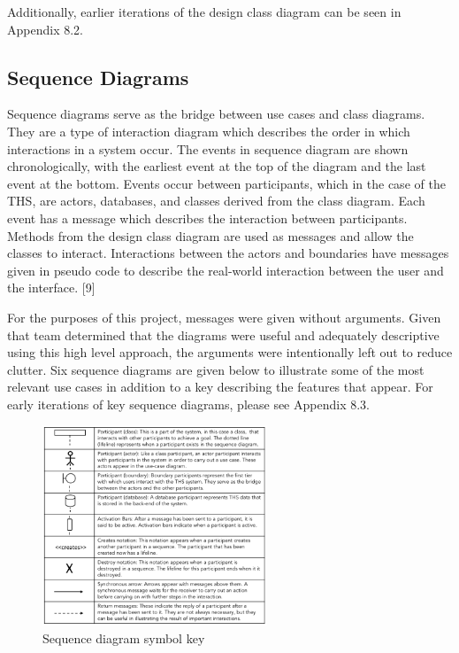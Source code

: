 Additionally, earlier iterations of the design class diagram can be seen
in Appendix 8.2.

\hypertarget{sequence-diagrams}{%
\subsection{Sequence Diagrams}\label{sequence-diagrams}}

Sequence diagrams serve as the bridge between use cases and class
diagrams. They are a type of interaction diagram which describes the
order in which interactions in a system occur. The events in sequence
diagram are shown chronologically, with the earliest event at the top of
the diagram and the last event at the bottom. Events occur between
participants, which in the case of the THS, are actors, databases, and
classes derived from the class diagram. Each event has a message which
describes the interaction between participants. Methods from the design
class diagram are used as messages and allow the classes to interact.
Interactions between the actors and boundaries have messages given in
pseudo code to describe the real-world interaction between the user and
the interface. {[}9{]}

For the purposes of this project, messages were given without arguments.
Given that team determined that the diagrams were useful and adequately
descriptive using this high level approach, the arguments were
intentionally left out to reduce clutter. Six sequence diagrams are
given below to illustrate some of the most relevant use cases in
addition to a key describing the features that appear. For early
iterations of key sequence diagrams, please see Appendix 8.3.

\begin{figure}[H]
      \centering
      \includegraphics[trim = 0 0 0 0, clip, width=0.6\textwidth]{TempImg/SDKey.png}
      \caption{Sequence diagram symbol key}
\end{figure}

